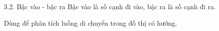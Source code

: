 \documentclass{beamer}
\begin{document}
\begin{frame}{3.2. Bậc vào - bậc ra}
\Large
Bậc vào là số cạnh đi vào, bậc ra là số cạnh đi ra.

\vspace{0.3cm}
Dùng để phân tích luồng di chuyển trong đồ thị có hướng.
\end{frame}
\end{document}
